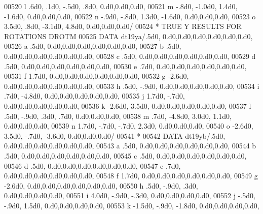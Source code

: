 \begin{DoxyCode}
00520      l            .6d0,   .1d0,  -.5d0,   .8d0,          0.d0,0.d0,0.d0,
00521      m           -.8d0, -1.0d0,  1.4d0, -1.6d0,          0.d0,0.d0,0.d0,
00522      n           -.9d0,  -.8d0,  1.3d0, -1.6d0,          0.d0,0.d0,0.d0,
00523      o           3.5d0,   .8d0, -3.1d0,  4.8d0,          0.d0,0.d0,0.d0/
00524 \textcolor{comment}{*                        TRUE Y RESULTS FOR ROTATIONS DROTM}
00525       \textcolor{keyword}{DATA} dt19ya/.5d0,                  0.d0,0.d0,0.d0,0.d0,0.d0,0.d0,
00526      a            .5d0,                  0.d0,0.d0,0.d0,0.d0,0.d0,0.d0,
00527      b            .5d0,                  0.d0,0.d0,0.d0,0.d0,0.d0,0.d0,
00528      c            .5d0,                  0.d0,0.d0,0.d0,0.d0,0.d0,0.d0,
00529      d            .5d0,                  0.d0,0.d0,0.d0,0.d0,0.d0,0.d0,
00530      e            .7d0,                  0.d0,0.d0,0.d0,0.d0,0.d0,0.d0,
00531      f           1.7d0,                  0.d0,0.d0,0.d0,0.d0,0.d0,0.d0,
00532      g          -2.6d0,                  0.d0,0.d0,0.d0,0.d0,0.d0,0.d0,
00533      h            .5d0,  -.9d0,             0.d0,0.d0,0.d0,0.d0,0.d0,
00534      i            .7d0, -4.8d0,             0.d0,0.d0,0.d0,0.d0,0.d0,
00535      j           1.7d0,  -.7d0,             0.d0,0.d0,0.d0,0.d0,0.d0,
00536      k          -2.6d0,  3.5d0,             0.d0,0.d0,0.d0,0.d0,0.d0,
00537      l            .5d0,  -.9d0,   .3d0,   .7d0,          0.d0,0.d0,0.d0,
00538      m            .7d0, -4.8d0,  3.0d0,  1.1d0,          0.d0,0.d0,0.d0,
00539      n           1.7d0,  -.7d0,  -.7d0,  2.3d0,          0.d0,0.d0,0.d0,
00540      o          -2.6d0,  3.5d0,  -.7d0, -3.6d0,          0.d0,0.d0,0.d0/
00541 \textcolor{comment}{*}
00542       \textcolor{keyword}{DATA} dt19yb/.5d0,                  0.d0,0.d0,0.d0,0.d0,0.d0,0.d0,
00543      a            .5d0,                  0.d0,0.d0,0.d0,0.d0,0.d0,0.d0,
00544      b            .5d0,                  0.d0,0.d0,0.d0,0.d0,0.d0,0.d0,
00545      c            .5d0,                  0.d0,0.d0,0.d0,0.d0,0.d0,0.d0,
00546      d            .5d0,                  0.d0,0.d0,0.d0,0.d0,0.d0,0.d0,
00547      e            .7d0,                  0.d0,0.d0,0.d0,0.d0,0.d0,0.d0,
00548      f           1.7d0,                  0.d0,0.d0,0.d0,0.d0,0.d0,0.d0,
00549      g          -2.6d0,                  0.d0,0.d0,0.d0,0.d0,0.d0,0.d0,
00550      h            .5d0,  -.9d0,   .3d0,             0.d0,0.d0,0.d0,0.d0,
00551      i           4.0d0,  -.9d0,  -.3d0,             0.d0,0.d0,0.d0,0.d0,
00552      j           -.5d0,  -.9d0,  1.5d0,             0.d0,0.d0,0.d0,0.d0,
00553      k          -1.5d0,  -.9d0, -1.8d0,             0.d0,0.d0,0.d0,0.d0,

\end{DoxyCode}
